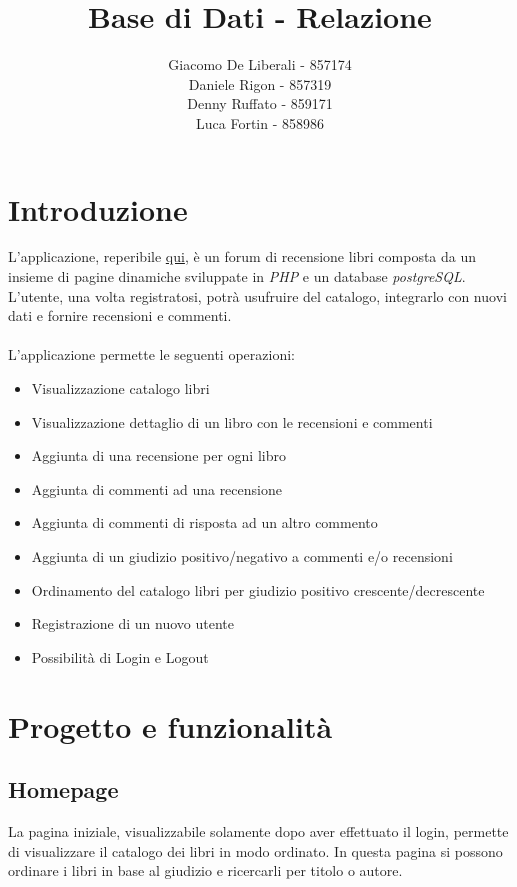\documentclass[italian]{article}
\author{
	Giacomo De Liberali - 857174\\
	Daniele Rigon - 857319 \\
	Denny Ruffato - 859171 \\
	Luca Fortin - 858986
}
\begin{document}
	
\title{Base di Dati - Relazione}
\maketitle

\tableofcontents
\pagebreak

\section{Introduzione}
L’applicazione, reperibile \href{http://wwwstud.dsi.unive.it/gdeliber/bd2017/}{qui}, è un forum di recensione libri composta da un insieme di pagine dinamiche sviluppate in \textit{PHP} e un database \textit{postgreSQL}. L'utente, una volta registratosi, potrà usufruire del catalogo, integrarlo con nuovi dati e fornire recensioni e commenti. \\\\

\noindent
L'applicazione permette le seguenti operazioni:
\begin{itemize}
	\item Visualizzazione catalogo libri
	\item Visualizzazione dettaglio di un libro con le recensioni e commenti
	\item Aggiunta di una recensione per ogni libro
	\item Aggiunta di commenti ad una recensione
	\item Aggiunta di commenti di risposta ad un altro commento
	\item Aggiunta di un giudizio positivo/negativo a commenti e/o recensioni
	\item Ordinamento del catalogo libri per giudizio positivo crescente/decrescente
	\item Registrazione di un nuovo utente
	\item Possibilità di Login e Logout
\end{itemize}
\section{Progetto e funzionalità}
\subsection{Homepage}
La pagina iniziale, visualizzabile solamente dopo aver effettuato il login, permette di visualizzare il catalogo dei libri in modo ordinato.
In questa pagina si possono ordinare i libri in base al giudizio e ricercarli per titolo o autore.
\end{document}
